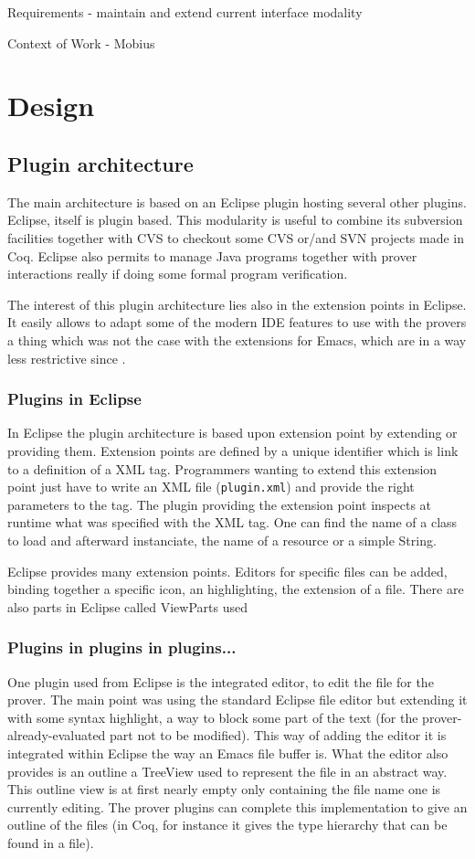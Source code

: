 \documentclass{entcs}
\begin{document}
Requirements - maintain and extend current interface modality

Context of Work - Mobius

\section{Design}

\subsection{Plugin architecture}
The main architecture is based on an Eclipse plugin hosting several other
plugins. Eclipse, itself is plugin based. This modularity is useful to 
combine its subversion facilities together with CVS to checkout some 
CVS or/and SVN projects made in Coq. Eclipse also permits to manage 
Java programs together with prover interactions really 
if doing some formal program verification.

The interest of this plugin architecture lies also in the extension points 
 in Eclipse. It easily allows to adapt some of the modern 
IDE features to use with the provers a thing which was not the case
with the extensions for Emacs, which are in a way less restrictive
since .
\subsubsection{Plugins in Eclipse}
In Eclipse the plugin architecture is based upon extension point by
extending or providing them. 
Extension points are defined by a unique identifier which is link
to a definition of a XML tag. Programmers wanting to extend
this extension point just have to write an XML file ({\tt plugin.xml}) 
and provide the right parameters to the tag.
The plugin providing the extension point inspects at runtime what was 
specified with the XML tag. One can find the name of a class to load
and afterward instanciate, the name of a resource or a simple String.

Eclipse provides many extension points. Editors for specific files can be
added, binding together a specific icon, an highlighting, the extension of a
file. There are also parts in Eclipse called ViewParts used
\subsubsection{Plugins in plugins in plugins...}
One plugin used from Eclipse is the integrated editor, to edit the 
file for the prover. The main point was using the standard Eclipse file editor
but extending it with some syntax highlight, a way to block some part
of the text (for the prover-already-evaluated part not to be modified). This
way of adding the editor it is integrated within Eclipse the way an Emacs 
file buffer is.  What the editor also provides is an outline a TreeView
used to represent the file in an abstract way. This outline view
is at first nearly empty only containing the file name one is currently
editing. The prover plugins can complete this implementation to give
an outline of the files (in Coq, for instance it gives the type
hierarchy that can be found in a file).
\end{document}
